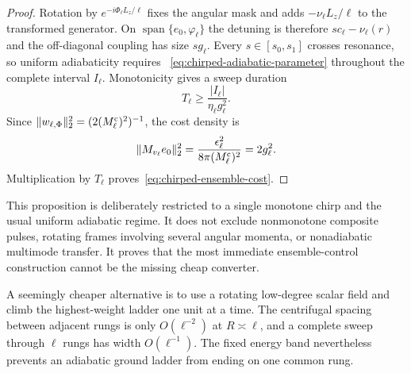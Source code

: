 \documentclass[11pt]{article}
\theoremstyle{definition}
\theoremstyle{remark}
\begin{document}
\begin{proof}
Rotation by $e^{-i\Phi_\ell L_z/\ell}$ fixes the angular mask and adds
$-\nu_\ell L_z/\ell$ to the transformed generator.  On
$\operatorname{span}\{e_0,\varphi_\ell\}$ the detuning is therefore
$sc_\ell-\nu_\ell(r)$ and the off-diagonal coupling has size $s g_\ell$.
Every $s\in[s_0,s_1]$ crosses resonance, so uniform adiabaticity requires
~\eqref{eq:chirped-adiabatic-parameter} throughout the complete interval
$I_\ell$.  Monotonicity gives a sweep duration
\begin{equation}
 T_\ell\geq\frac{|I_\ell|}{\eta_\ell g_\ell^2}.
\end{equation}
Since
$\|w_{\ell,\Phi}\|_2^2=(2(M_\ell^{\rm c})^2)^{-1}$, the cost density is
\begin{equation}
 \|M_{v_\ell}e_0\|_2^2
 =\frac{\epsilon_\ell^2}{8\pi(M_\ell^{\rm c})^2}
 =2g_\ell^2.
\end{equation}
Multiplication by $T_\ell$ proves~\eqref{eq:chirped-ensemble-cost}.
\end{proof}

This proposition is deliberately restricted to a single monotone chirp and
the usual uniform adiabatic regime.  It does not exclude nonmonotone composite
pulses, rotating frames involving several angular momenta, or nonadiabatic
multimode transfer.  It proves that the most immediate ensemble-control
construction cannot be the missing cheap converter.

A seemingly cheaper alternative is to use a rotating low-degree scalar field
and climb the highest-weight ladder one unit at a time.  The centrifugal
spacing between adjacent rungs is only $O(\ell^{-2})$ at $R\asymp\ell$, and a
complete sweep through $\ell$ rungs has width $O(\ell^{-1})$.  The fixed energy
band nevertheless prevents an adiabatic ground ladder from ending on one
common rung.
\end{document}
